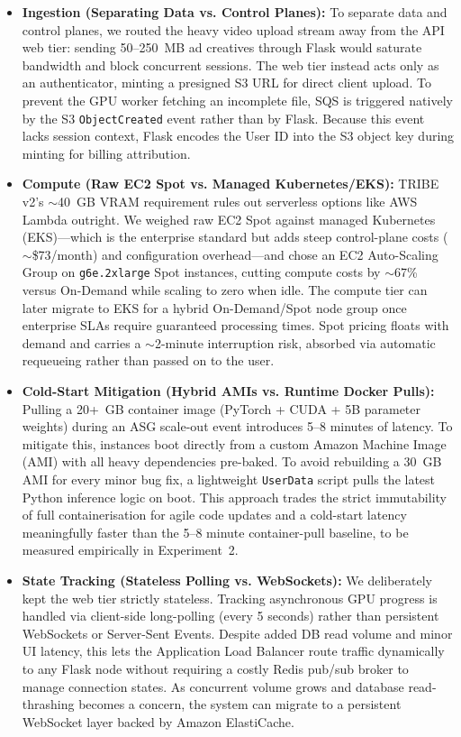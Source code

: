 \documentclass[10pt,a4paper]{article}
\begin{document}
\begin{itemize}
    \item \textbf{Ingestion (Separating Data vs. Control Planes):} To separate data and control planes, we routed the heavy video upload stream away from the API web tier: sending 50--250~MB ad creatives through Flask would saturate bandwidth and block concurrent sessions. The web tier instead acts only as an authenticator, minting a presigned S3 URL for direct client upload. To prevent the GPU worker fetching an incomplete file, SQS is triggered natively by the S3 \texttt{ObjectCreated} event rather than by Flask. Because this event lacks session context, Flask encodes the User ID into the S3 object key during minting for billing attribution.

    \item \textbf{Compute (Raw EC2 Spot vs. Managed Kubernetes/EKS):} TRIBE v2's $\sim$40~GB VRAM requirement rules out serverless options like AWS Lambda outright. We weighed raw EC2 Spot against managed Kubernetes (EKS)---which is the enterprise standard but adds steep control-plane costs ($\sim$\$73/month) and configuration overhead---and chose an EC2 Auto-Scaling Group on \texttt{g6e.2xlarge} Spot instances, cutting compute costs by $\sim$67\% versus On-Demand while scaling to zero when idle. The compute tier can later migrate to EKS for a hybrid On-Demand/Spot node group once enterprise SLAs require guaranteed processing times. Spot pricing floats with demand and carries a $\sim$2-minute interruption risk, absorbed via automatic requeueing rather than passed on to the user.

    \item \textbf{Cold-Start Mitigation (Hybrid AMIs vs. Runtime Docker Pulls):} Pulling a 20+~GB container image (PyTorch + CUDA + 5B parameter weights) during an ASG scale-out event introduces 5--8 minutes of latency. To mitigate this, instances boot directly from a custom Amazon Machine Image (AMI) with all heavy dependencies pre-baked. To avoid rebuilding a 30~GB AMI for every minor bug fix, a lightweight \texttt{UserData} script pulls the latest Python inference logic on boot. This approach trades the strict immutability of full containerisation for agile code updates and a cold-start latency meaningfully faster than the 5--8 minute container-pull baseline, to be measured empirically in Experiment~2.

    \item \textbf{State Tracking (Stateless Polling vs. WebSockets):} We deliberately kept the web tier strictly stateless. Tracking asynchronous GPU progress is handled via client-side long-polling (every 5 seconds) rather than persistent WebSockets or Server-Sent Events. Despite added DB read volume and minor UI latency, this lets the Application Load Balancer route traffic dynamically to any Flask node without requiring a costly Redis pub/sub broker to manage connection states. As concurrent volume grows and database read-thrashing becomes a concern, the system can migrate to a persistent WebSocket layer backed by Amazon ElastiCache.


\end{itemize}
\end{document}
